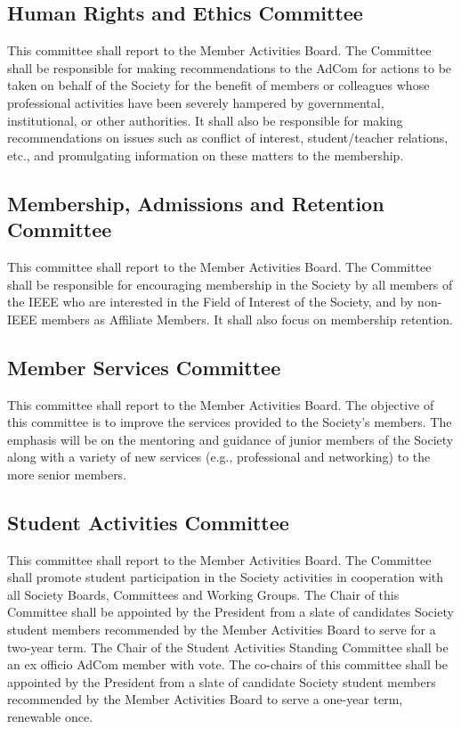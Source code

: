 \documentclass[10pt]{article}
\begin{document}
\subsection{Human Rights and Ethics Committee}

This committee shall report to the Member Activities Board. The Committee shall be responsible for making recommendations to the AdCom for actions to be taken on behalf of the Society for the benefit of members or colleagues whose professional activities have been severely hampered by governmental, institutional, or other authorities.    It shall also be responsible for making recommendations on issues such as conflict of interest, student/teacher relations, etc., and promulgating information on these matters to the membership. 


\subsection{Membership, Admissions and Retention Committee}

This committee shall report to the Member Activities Board. The Committee shall be responsible for encouraging membership in the Society by all members of the IEEE who are interested in the Field of Interest of the Society, and by non-IEEE members as Affiliate Members. It shall also focus on membership retention.


\subsection{Member Services Committee}
This committee shall report to the Member Activities Board. The objective of this committee is to improve the services provided to the Society’s members. The emphasis will be on the mentoring and guidance of junior members of the Society along with a variety of new services (e.g., professional and networking) to the more senior members.  


\subsection{Student Activities Committee}

This committee shall report to the Member Activities Board. The Committee shall promote student participation in the Society activities in cooperation with all Society Boards, Committees and Working Groups. The Chair of this Committee shall be appointed by the President from a slate of candidates Society student members recommended by the Member Activities Board to serve for a two-year term. The Chair of the Student Activities Standing Committee shall be an ex officio AdCom member with vote. The co-chairs of this committee shall be appointed by the President from a slate of candidate Society student members recommended by the Member Activities Board to serve a one-year term, renewable once.
\end{document}

